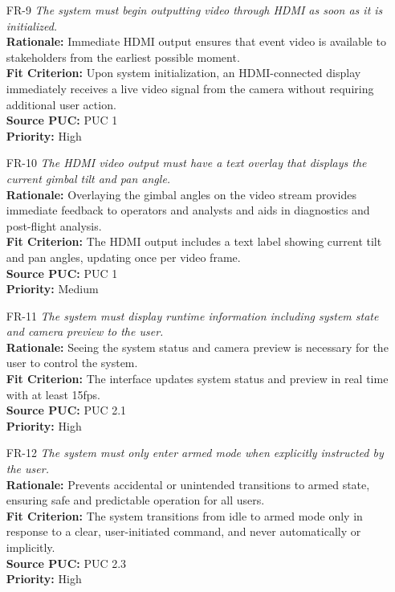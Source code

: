\documentclass[12pt]{article}
\begin{document}
\begin{itemize}[leftmargin=*]
  \item[FR-9] \emph{The system must begin outputting video through HDMI as soon as it
          is initialized.}\\[2mm]
        \textbf{Rationale:} Immediate HDMI output ensures that event video is available to stakeholders from the earliest possible moment.\\
        \textbf{Fit Criterion:} Upon system initialization, an HDMI-connected display immediately receives a live video signal from the camera without requiring additional user action.\\
        \textbf{Source PUC:} PUC 1 \\
        \textbf{Priority:} High

  \item[FR-10] \emph{The HDMI video output must have a text overlay that displays the
          current gimbal tilt and pan angle.}\\[2mm]
        \textbf{Rationale:} Overlaying the gimbal angles on the video stream provides immediate feedback to operators and analysts and aids in diagnostics and post-flight analysis.\\
        \textbf{Fit Criterion:} The HDMI output includes a text label showing current tilt and pan angles, updating once per video frame.\\
        \textbf{Source PUC:} PUC 1 \\
        \textbf{Priority:} Medium

  \item[FR-11] \emph{The system must display runtime information including system state
          and camera preview to the user.}\\[2mm]
        \textbf{Rationale:} Seeing the system status and camera preview is necessary for the user to control the system.\\
        \textbf{Fit Criterion:} The interface updates system status and preview in real time with at least 15fps.\\
        \textbf{Source PUC:} PUC 2.1 \\
        \textbf{Priority:} High

  \item[FR-12] \emph{The system must only enter armed mode when explicitly instructed
          by the user.}\\[2mm]
        \textbf{Rationale:} Prevents accidental or unintended transitions to armed state, ensuring safe and predictable operation for all users.\\
        \textbf{Fit Criterion:} The system transitions from idle to armed mode only in response to a clear, user-initiated command, and never automatically or implicitly.\\
        \textbf{Source PUC:} PUC 2.3 \\
        \textbf{Priority:} High


\end{itemize}
\end{document}
